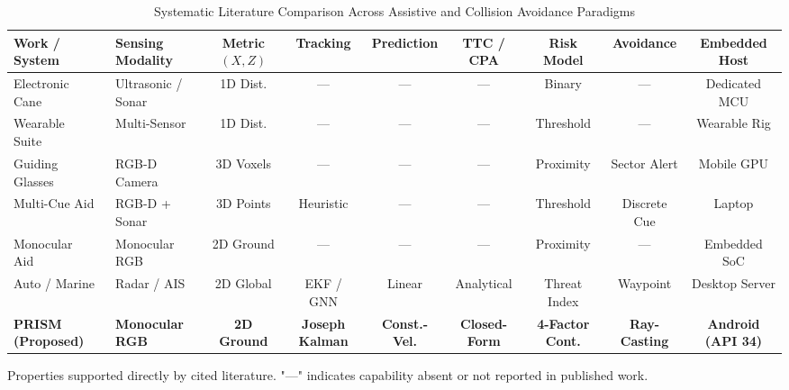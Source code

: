 \begin{table}[t]
\caption{Systematic Literature Comparison Across Assistive and Collision Avoidance Paradigms}
\label{tab:literature_comparison}
\centering
\scriptsize
\setlength{\tabcolsep}{3.5pt}
\begin{tabularx}{\textwidth}{p{3.2cm}p{2.1cm}ccccccc}
\toprule
\textbf{Work / System} & \textbf{Sensing Modality} & \textbf{Metric $(X,Z)$} & \textbf{Tracking} & \textbf{Prediction} & \textbf{TTC / CPA} & \textbf{Risk Model} & \textbf{Avoidance} & \textbf{Embedded Host} \\
\midrule
Electronic Cane~\cite{faria2010electronic} & Ultrasonic / Sonar & 1D Dist. & --- & --- & --- & Binary & --- & Dedicated MCU \\
Wearable Suite~\cite{elmannai2017sensor} & Multi-Sensor & 1D Dist. & --- & --- & --- & Threshold & --- & Wearable Rig \\
Guiding Glasses~\cite{bai2017smart} & RGB-D Camera & 3D Voxels & --- & --- & --- & Proximity & Sector Alert & Mobile GPU \\
Multi-Cue Aid~\cite{zhao2020visual} & RGB-D + Sonar & 3D Points & Heuristic & --- & --- & Threshold & Discrete Cue & Laptop \\
Monocular Aid~\cite{lin2021real} & Monocular RGB & 2D Ground & --- & --- & --- & Proximity & --- & Embedded SoC \\
Auto / Marine~\cite{tam2009review, hayward1972characteristics} & Radar / AIS & 2D Global & EKF / GNN & Linear & Analytical & Threat Index & Waypoint & Desktop Server \\
\midrule
\textbf{PRISM (Proposed)} & \textbf{Monocular RGB} & \textbf{2D Ground} & \textbf{Joseph Kalman} & \textbf{Const.-Vel.} & \textbf{Closed-Form} & \textbf{4-Factor Cont.} & \textbf{Ray-Casting} & \textbf{Android (API 34)} \\
\bottomrule
\end{tabularx}
\vspace{0.04cm}
\par{\raggedright \scriptsize Properties supported directly by cited literature. "---" indicates capability absent or not reported in published work.\par}
\end{table}
